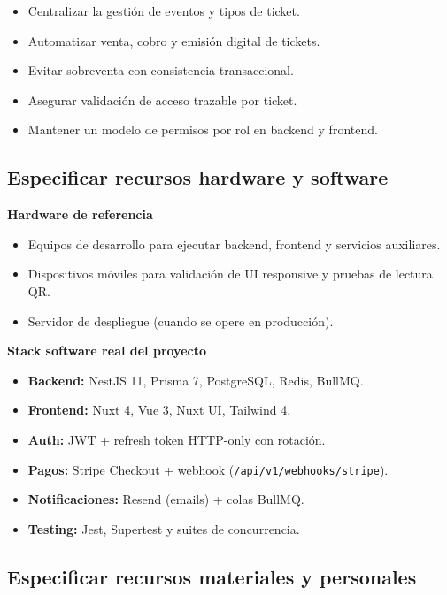 \documentclass[
  11pt,
  a4paper,
  twoside=false,
  parskip=half               %
]{scrreprt}                  %
\providecommand{\tightlist}{%
  \setlength{\itemsep}{0pt}\setlength{\parskip}{0pt}}
\begin{document}
\begin{itemize}
\tightlist
\item
  Centralizar la gestión de eventos y tipos de ticket.
\item
  Automatizar venta, cobro y emisión digital de tickets.
\item
  Evitar sobreventa con consistencia transaccional.
\item
  Asegurar validación de acceso trazable por ticket.
\item
  Mantener un modelo de permisos por rol en backend y frontend.
\end{itemize}

\hypertarget{especificar-recursos-hardware-y-software}{%
\subsection{Especificar recursos hardware y
software}\label{especificar-recursos-hardware-y-software}}

\textbf{Hardware de referencia}

\begin{itemize}
\tightlist
\item
  Equipos de desarrollo para ejecutar backend, frontend y servicios
  auxiliares.
\item
  Dispositivos móviles para validación de UI responsive y pruebas de
  lectura QR.
\item
  Servidor de despliegue (cuando se opere en producción).
\end{itemize}

\textbf{Stack software real del proyecto}

\begin{itemize}
\tightlist
\item
  \textbf{Backend:} NestJS 11, Prisma 7, PostgreSQL, Redis, BullMQ.
\item
  \textbf{Frontend:} Nuxt 4, Vue 3, Nuxt UI, Tailwind 4.
\item
  \textbf{Auth:} JWT + refresh token HTTP-only con rotación.
\item
  \textbf{Pagos:} Stripe Checkout + webhook
  (\texttt{/api/v1/webhooks/stripe}).
\item
  \textbf{Notificaciones:} Resend (emails) + colas BullMQ.
\item
  \textbf{Testing:} Jest, Supertest y suites de concurrencia.
\end{itemize}

\hypertarget{especificar-recursos-materiales-y-personales}{%
\subsection{Especificar recursos materiales y
personales}\label{especificar-recursos-materiales-y-personales}}
\end{document}
